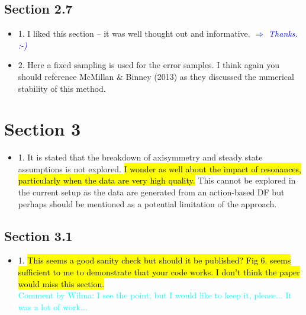 \documentclass[10pt,a4paper]{article}
\newcommand{\HW}[1]{\textcolor{Cyan}{#1}}
\newcommand{\Comment}[1]{\textsl{\textcolor{Blue}{$\Longrightarrow$ {#1}}}}
\begin{document}
\subsection{Section 2.7}
\begin{itemize}
\item 1. I liked this section -- it was well thought out and informative. \Comment{Thanks. :-)}
\item 2. Here a fixed sampling is used for the error samples. I think again you should reference McMillan \& Binney (2013) as they discussed the numerical stability of this method.
\end{itemize}

\section{Section 3}
\begin{itemize}
\item 1. It is stated that the breakdown of axisymmetry and steady state assumptions is not explored. \hl{I wonder as well about the impact of resonances, particularly when the data are very high quality.} This cannot be explored in the current setup as the data are generated from an action-based DF but perhaps should be mentioned as a potential limitation of the approach.
\end{itemize}


\subsection{Section 3.1}
\begin{itemize}
\item 1. \hl{This seems a good sanity check but should it be published? Fig 6. seems sufficient to me to demonstrate that your code works. I don't think the paper would miss this section.}\\\HW{Comment by Wilma: I see the point, but I would like to keep it, please... It was a lot of work...}
\end{itemize}
\end{document}

